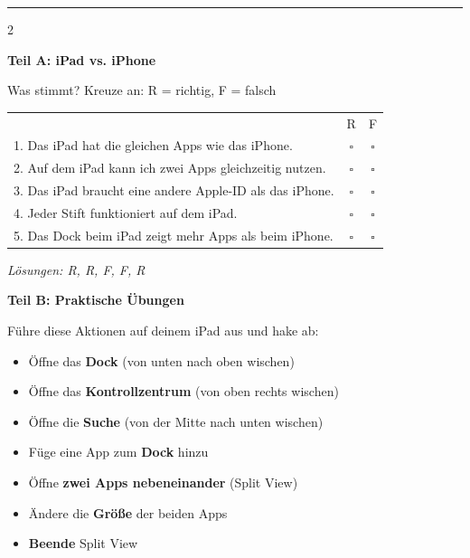 \documentclass[a4paper,landscape,8pt]{extarticle}
\begin{document}
\vspace{1mm}
\hrule
\vspace{2mm}

\begin{multicols}{2}

\textbf{\large Teil A: iPad vs. iPhone}

Was stimmt? Kreuze an: R = richtig, F = falsch

\vspace{2mm}

\renewcommand{\arraystretch}{1.4}
\begin{tabular}{@{}p{8cm}cc@{}}
& R & F \\
1. Das iPad hat die gleichen Apps wie das iPhone. & $\square$ & $\square$ \\
2. Auf dem iPad kann ich zwei Apps gleichzeitig nutzen. & $\square$ & $\square$ \\
3. Das iPad braucht eine andere Apple-ID als das iPhone. & $\square$ & $\square$ \\
4. Jeder Stift funktioniert auf dem iPad. & $\square$ & $\square$ \\
5. Das Dock beim iPad zeigt mehr Apps als beim iPhone. & $\square$ & $\square$ \\
\end{tabular}
\renewcommand{\arraystretch}{1}

\textit{\footnotesize Lösungen: R, R, F, F, R}

\vspace{4mm}

\textbf{\large Teil B: Praktische Übungen}

Führe diese Aktionen auf deinem iPad aus und hake ab:

\vspace{2mm}

\begin{itemize}[label=$\square$, itemsep=3pt]
\item Öffne das \textbf{Dock} (von unten nach oben wischen)
\item Öffne das \textbf{Kontrollzentrum} (von oben rechts wischen)
\item Öffne die \textbf{Suche} (von der Mitte nach unten wischen)
\item Füge eine App zum \textbf{Dock} hinzu
\item Öffne \textbf{zwei Apps nebeneinander} (Split View)
\item Ändere die \textbf{Größe} der beiden Apps
\item \textbf{Beende} Split View
\end{itemize}


\end{multicols}
\end{document}

